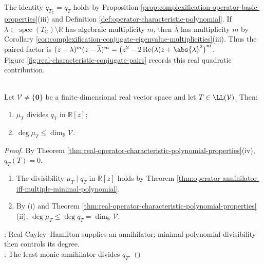 The identity $q_{T_{\mathbb{C}}}=q_T$ holds by Proposition \ref{prop:complexification-operator-basic-properties}(iii) and Definition \ref{def:operator-characteristic-polynomial}. If $\lambda\in\operatorname{spec}(T_{\mathbb{C}})\setminus\mathbb{R}$ has algebraic multiplicity $m$, then $\overline{\lambda}$ has multiplicity $m$ by Corollary \ref{cor:complexification-conjugate-eigenvalue-multiplicities}(iii). Thus the paired factor is $(z-\lambda)^m(z-\overline{\lambda})^m=\bigl(z^2-2\operatorname{Re}(\lambda)z+\abs{\lambda}^2\bigr)^m$.\\
Figure \ref{fig:real-characteristic-conjugate-pairs} records this real quadratic contribution.

\begin{illustrationfigure}[H]
  \centering
  
  \caption{Conjugate factors pair into real quadratics.}
  \label{fig:real-characteristic-conjugate-pairs}
\end{illustrationfigure}

\begin{corollary} \label{cor:real-characteristic-polynomial-multiple-minimal-polynomial} \\
Let $\mathcal{V}\neq\{\mathbf{0}\}$ be a finite-dimensional real vector space and let $T\in\LL(\mathcal{V})$. Then:
\begin{enumerate}[label=(\roman*)]
\setlength{\itemsep}{0pt}
\item $\mu_T$ divides $q_T$ in $\mathbb{R}[z]$;
\item $\deg\mu_T\leq\dim_{\mathbb{R}}\mathcal{V}$.
\end{enumerate}
\begin{proof}
By Theorem \ref{thm:real-operator-characteristic-polynomial-properties}(iv), $q_T(T)=0$.
\begin{enumerate}[label=(\roman*)]
\setlength{\itemsep}{0pt}
\item The divisibility $\mu_T\mid q_T$ in $\mathbb{R}[z]$ holds by Theorem \ref{thm:operator-annihilator-iff-multiple-minimal-polynomial}.
\item By (i) and Theorem \ref{thm:real-operator-characteristic-polynomial-properties}(ii), $\deg\mu_T\leq\deg q_T=\dim_{\mathbb{R}}\mathcal{V}$.
\end{enumerate}
: Real Cayley--Hamilton supplies an annihilator; minimal-polynomial divisibility then controls its degree.\\
: The least monic annihilator divides $q_T$.
\end{proof}
\end{corollary}

